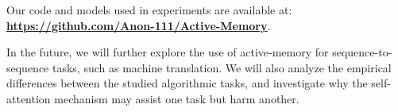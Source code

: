 \documentclass{article}
\begin{document}
Our code and models used in experiments are available at: \textbf{\url{https://github.com/Anon-111/Active-Memory}}. 

In the future, we will further explore the use of active-memory for sequence-to-sequence tasks, such as machine translation.
We will also analyze the empirical differences between the studied algorithmic tasks, and investigate why the self-attention mechanism may assist one task but harm another.

\balance


\end{document}
